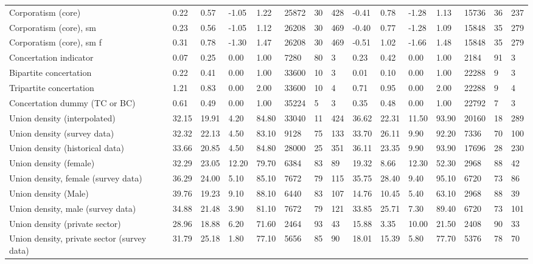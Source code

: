 \begin{longtable}{lllllllllllllll}
Corporatism (core) & 0.22 & 0.57 & -1.05 & 1.22 & 25872 & 30 & 428 & -0.41 & 0.78 & -1.28 & 1.13 & 15736 & 36 & 237\\
\addlinespace
Corporatism (core), sm & 0.23 & 0.56 & -1.05 & 1.12 & 26208 & 30 & 469 & -0.40 & 0.77 & -1.28 & 1.09 & 15848 & 35 & 279\\
Corporatism (core), sm f & 0.31 & 0.78 & -1.30 & 1.47 & 26208 & 30 & 469 & -0.51 & 1.02 & -1.66 & 1.48 & 15848 & 35 & 279\\
Concertation indicator & 0.07 & 0.25 & 0.00 & 1.00 & 7280 & 80 & 3 & 0.23 & 0.42 & 0.00 & 1.00 & 2184 & 91 & 3\\
Bipartite concertation & 0.22 & 0.41 & 0.00 & 1.00 & 33600 & 10 & 3 & 0.01 & 0.10 & 0.00 & 1.00 & 22288 & 9 & 3\\
Tripartite concertation & 1.21 & 0.83 & 0.00 & 2.00 & 33600 & 10 & 4 & 0.71 & 0.95 & 0.00 & 2.00 & 22288 & 9 & 4\\
\addlinespace
Concertation dummy (TC or BC) & 0.61 & 0.49 & 0.00 & 1.00 & 35224 & 5 & 3 & 0.35 & 0.48 & 0.00 & 1.00 & 22792 & 7 & 3\\
Union density (interpolated) & 32.15 & 19.91 & 4.20 & 84.80 & 33040 & 11 & 424 & 36.62 & 22.31 & 11.50 & 93.90 & 20160 & 18 & 289\\
Union density (survey data) & 32.32 & 22.13 & 4.50 & 83.10 & 9128 & 75 & 133 & 33.70 & 26.11 & 9.90 & 92.20 & 7336 & 70 & 100\\
Union density (historical data) & 33.66 & 20.85 & 4.50 & 84.80 & 28000 & 25 & 351 & 36.11 & 23.35 & 9.90 & 93.90 & 17696 & 28 & 230\\
Union density (female) & 32.29 & 23.05 & 12.20 & 79.70 & 6384 & 83 & 89 & 19.32 & 8.66 & 12.30 & 52.30 & 2968 & 88 & 42\\
\addlinespace
Union density, female (survey data) & 36.29 & 24.00 & 5.10 & 85.10 & 7672 & 79 & 115 & 35.75 & 28.40 & 9.40 & 95.10 & 6720 & 73 & 86\\
Union density (Male) & 39.76 & 19.23 & 9.10 & 88.10 & 6440 & 83 & 107 & 14.76 & 10.45 & 5.40 & 63.10 & 2968 & 88 & 39\\
Union density, male (survey data) & 34.88 & 21.48 & 3.90 & 81.10 & 7672 & 79 & 121 & 33.85 & 25.71 & 7.30 & 89.40 & 6720 & 73 & 101\\
Union density (private sector) & 28.96 & 18.88 & 6.20 & 71.60 & 2464 & 93 & 43 & 15.88 & 3.35 & 10.00 & 21.50 & 2408 & 90 & 33\\
Union density, private sector (survey data) & 31.79 & 25.18 & 1.80 & 77.10 & 5656 & 85 & 90 & 18.01 & 15.39 & 5.80 & 77.70 & 5376 & 78 & 70\\

\end{longtable}
